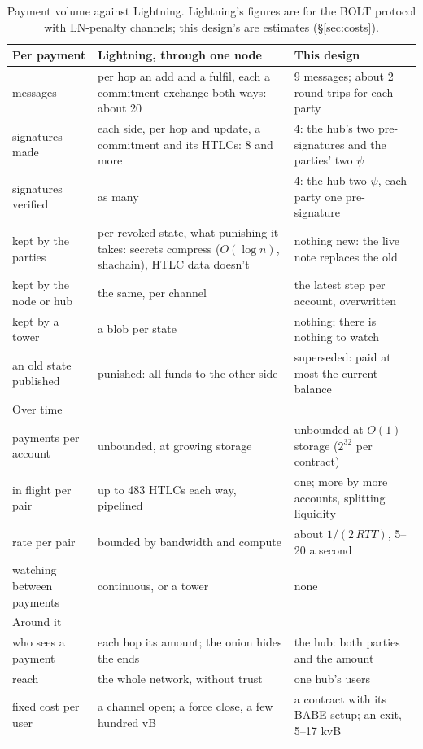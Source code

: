 \documentclass[11pt]{article}
\theoremstyle{plain}
\theoremstyle{definition}
\renewcommand{\arraystretch}{1.3}
\begin{document}
\begin{table}[!tbp]
\centering\small
\renewcommand{\arraystretch}{1.15}
\begin{tabularx}{\linewidth}{>{\raggedright\arraybackslash}p{2.7cm}LL}
\toprule
Per payment & Lightning, through one node & This design \\
\midrule
messages & per hop an add and a fulfil, each a commitment exchange both ways: about 20 & 9 messages; about 2 round trips for each party \\
signatures made & each side, per hop and update, a commitment and its HTLCs: 8 and more & 4: the hub's two pre-signatures and the parties' two $\psi$ \\
signatures verified & as many & 4: the hub two $\psi$, each party one pre-signature \\
kept by the parties & per revoked state, what punishing it takes: secrets compress ($O(\log n)$, shachain), HTLC data doesn't & nothing new: the live note replaces the old \\
kept by the node or hub & the same, per channel & the latest step per account, overwritten \\
kept by a tower & a blob per state & nothing; there is nothing to watch \\
an old state published & punished: all funds to the other side & superseded: paid at most the current balance \\
\midrule
Over time & & \\
\midrule
payments per account & unbounded, at growing storage & unbounded at $O(1)$ storage ($2^{32}$ per contract) \\
in flight per pair & up to 483 HTLCs each way, pipelined & one; more by more accounts, splitting liquidity \\
rate per pair & bounded by bandwidth and compute & about $1/(2\,\mathit{RTT})$, 5--20 a second \\
watching between payments & continuous, or a tower & none \\
\midrule
Around it & & \\
\midrule
who sees a payment & each hop its amount; the onion hides the ends & the hub: both parties and the amount \\
reach & the whole network, without trust & one hub's users \\
fixed cost per user & a channel open; a force close, a few hundred vB & a contract with its BABE setup; an exit, 5--17 kvB \\
\bottomrule
\end{tabularx}
\caption{Payment volume against Lightning. Lightning's figures are for
the BOLT protocol with LN-penalty channels; this design's are
estimates (\S\ref{sec:costs}).}
\label{tab:ln}
\end{table}
\end{document}
